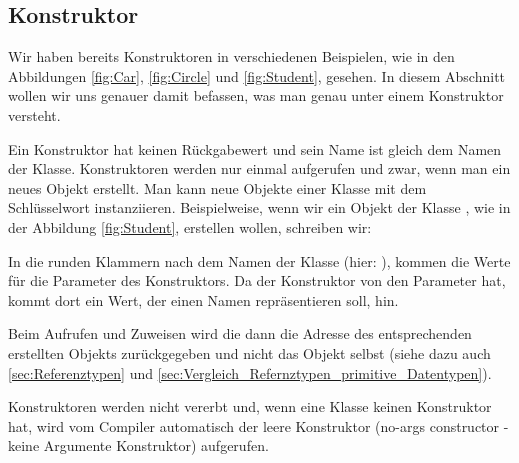 \documentclass{tuda-pub}
\begin{document}
  \clearpage

  \subsection{Konstruktor}
  \label{sec:Konstruktor}

  Wir haben bereits Konstruktoren in verschiedenen Beispielen, wie in den Abbildungen
  \ref{fig:Car}, \ref{fig:Circle} und \ref{fig:Student}, gesehen. In diesem Abschnitt wollen wir
  uns genauer damit befassen, was man genau unter einem Konstruktor versteht.

  \br

  Ein Konstruktor hat keinen Rückgabewert und sein Name ist gleich dem Namen der Klasse.
  Konstruktoren werden nur einmal aufgerufen und zwar, wenn man ein neues Objekt erstellt. Man
  kann neue Objekte einer Klasse mit dem Schlüsselwort  instanziieren.
  Beispielweise, wenn wir ein Objekt der Klasse , wie in der Abbildung
  \ref{fig:Student}, erstellen wollen, schreiben wir:

  \br

  \begin{center}
  \end{center}

  \br

  In die runden Klammern nach dem Namen der Klasse (hier: ), kommen die Werte
  für die Parameter des Konstruktors. Da der Konstruktor von  den Parameter
   hat, kommt dort ein Wert, der einen Namen repräsentieren soll, hin.

  \begin{note}[title=Achtung:, color=tuda-orange]
    Beim Aufrufen und Zuweisen wird die dann die Adresse des entsprechenden erstellten Objekts
    zurückgegeben und nicht das Objekt selbst (siehe dazu auch \ref{sec:Referenztypen} und
    \ref{sec:Vergleich_Refernztypen_primitive_Datentypen}).
  \end{note}

  \br

  Konstruktoren werden nicht vererbt und, wenn eine Klasse keinen Konstruktor hat, wird vom
  Compiler automatisch der leere Konstruktor (no-args constructor - keine Argumente Konstruktor)
  aufgerufen.

  \br
\end{document}
